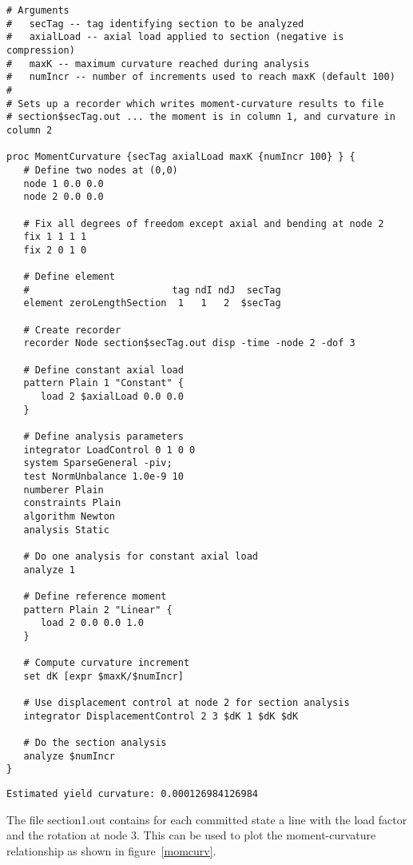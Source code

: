 \documentclass[12pt]{article}
\begin{document}
{\sf\small
\begin{verbatim}
# Arguments
#	secTag -- tag identifying section to be analyzed
#	axialLoad -- axial load applied to section (negative is compression)
#	maxK -- maximum curvature reached during analysis
#	numIncr -- number of increments used to reach maxK (default 100)
#
# Sets up a recorder which writes moment-curvature results to file
# section$secTag.out ... the moment is in column 1, and curvature in column 2

proc MomentCurvature {secTag axialLoad maxK {numIncr 100} } {
   # Define two nodes at (0,0)
   node 1 0.0 0.0
   node 2 0.0 0.0

   # Fix all degrees of freedom except axial and bending at node 2
   fix 1 1 1 1
   fix 2 0 1 0

   # Define element
   #                         tag ndI ndJ  secTag
   element zeroLengthSection  1   1   2  $secTag

   # Create recorder
   recorder Node section$secTag.out disp -time -node 2 -dof 3

   # Define constant axial load
   pattern Plain 1 "Constant" {
      load 2 $axialLoad 0.0 0.0
   }

   # Define analysis parameters
   integrator LoadControl 0 1 0 0
   system SparseGeneral -piv;
   test NormUnbalance 1.0e-9 10
   numberer Plain
   constraints Plain
   algorithm Newton
   analysis Static

   # Do one analysis for constant axial load
   analyze 1

   # Define reference moment
   pattern Plain 2 "Linear" {
      load 2 0.0 0.0 1.0
   }

   # Compute curvature increment
   set dK [expr $maxK/$numIncr]

   # Use displacement control at node 2 for section analysis
   integrator DisplacementControl 2 3 $dK 1 $dK $dK

   # Do the section analysis
   analyze $numIncr
}

\end{verbatim}}


\pagebreak
\vspace{0.2in} 

{\sf\small
\begin{verbatim}
Estimated yield curvature: 0.000126984126984
\end{verbatim}
}

The file section1.out contains for each committed state
a line with the load factor and the rotation at node 3. This can be
used to plot the moment-curvature relationship as shown in
figure~\ref{momcurv}.   
\end{document}

